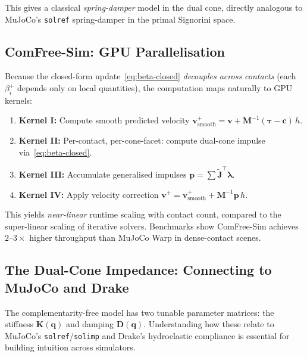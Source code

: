 \documentclass[11pt,twoside]{report}
\theoremstyle{definition}
\theoremstyle{plain}
\theoremstyle{remark}
\newcommand{\q}{\bm{q}}
\newcommand{\0}{\bm{0}}
\newcommand{\M}{\bm{M}}
\newcommand{\J}{\bm{J}}
\begin{document}
This gives a classical \emph{spring-damper} model in the dual cone, directly
analogous to MuJoCo's \texttt{solref} spring-damper in the primal Signorini space.

\subsection{ComFree-Sim: GPU Parallelisation}

Because the closed-form update~\eqref{eq:beta-closed} \emph{decouples across contacts}
(each $\beta_{i}^{+}$ depends only on local quantities), the computation maps
naturally to GPU kernels:
\begin{enumerate}
\item \textbf{Kernel I:} Compute smooth predicted velocity $\bm{v}_{\text{smooth}}^{+}=\bm{v}+\M^{-1}(\bm{\tau}-\bm{c})\,h$.
\item \textbf{Kernel II:} Per-contact, per-cone-facet: compute dual-cone impulse via~\eqref{eq:beta-closed}.
\item \textbf{Kernel III:} Accumulate generalised impulses $\bm{p}=\sum\tilde{\J}^{\!\top}\bm{\lambda}$.
\item \textbf{Kernel IV:} Apply velocity correction $\bm{v}^{+}=\bm{v}_{\text{smooth}}^{+}+\M^{-1}\bm{p}\,h$.
\end{enumerate}

This yields \emph{near-linear} runtime scaling with contact count, compared to
the super-linear scaling of iterative solvers.  Benchmarks show ComFree-Sim
achieves $2$--$3\times$ higher throughput than MuJoCo Warp in dense-contact scenes.

\subsection{The Dual-Cone Impedance: Connecting to MuJoCo and Drake}
\label{sec:impedance-comparison}

The complementarity-free model has two tunable parameter matrices: the stiffness
$\bm{K}(\q)$ and damping $\bm{D}(\q)$.  Understanding how these relate to
MuJoCo's \texttt{solref}/\texttt{solimp} and Drake's hydroelastic compliance
is essential for building intuition across simulators.
\end{document}
